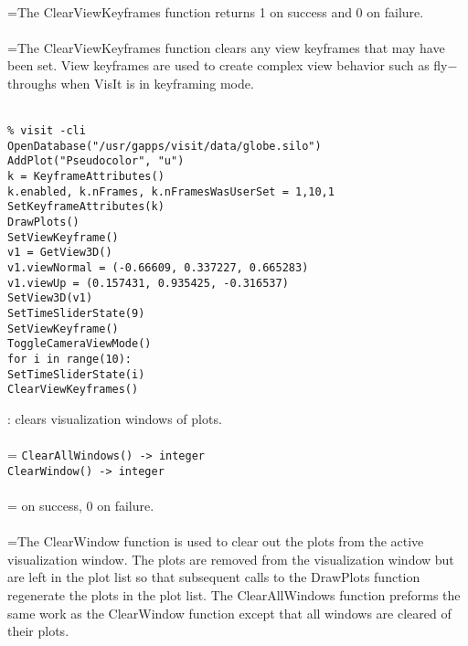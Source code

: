 \documentclass[10pt,a4paper]{report}
\begin{document}
 \\ 
\hangindent=\parindent The ClearViewKeyframes function returns 1 on success and 0 on failure. \\[-3mm] 

 \\ 
\hangindent=\parindent The ClearViewKeyframes function clears any view keyframes that may have been set. View keyframes are used to create complex view behavior such as fly$-$throughs when VisIt is in keyframing mode. \\[-3mm] 

\\[-6mm]
\begin{verbatim}% visit -cli
OpenDatabase("/usr/gapps/visit/data/globe.silo")
AddPlot("Pseudocolor", "u")
k = KeyframeAttributes()
k.enabled, k.nFrames, k.nFramesWasUserSet = 1,10,1
SetKeyframeAttributes(k)
DrawPlots()
SetViewKeyframe()
v1 = GetView3D()
v1.viewNormal = (-0.66609, 0.337227, 0.665283)
v1.viewUp = (0.157431, 0.935425, -0.316537)
SetView3D(v1)
SetTimeSliderState(9)
SetViewKeyframe()
ToggleCameraViewMode()
for i in range(10):
SetTimeSliderState(i)
ClearViewKeyframes()
\end{verbatim}
\newpage


{}
: clears visualization windows of plots.\\[-3mm]

 \\ 
\hangindent=\parindent 
\verb!ClearAllWindows() -> integer!\\ 
\verb!ClearWindow() -> integer!\\ [-3mm]

 \\ 
\hangindent= on success, 0 on failure. \\[-3mm] 

 \\ 
\hangindent=\parindent The ClearWindow function is used to clear out the plots from the active visualization window. The plots are removed from the visualization window but are left in the plot list so that subsequent calls to the DrawPlots function regenerate the plots in the plot list. The ClearAllWindows function preforms the same work as the ClearWindow function except that all windows are cleared of their plots. \\[-3mm] 
\end{document}
